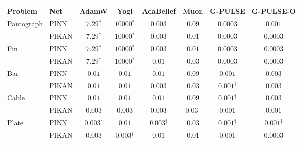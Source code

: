 \begin{tabular}{llcccccc}
\toprule
Problem & Net & AdamW & Yogi & AdaBelief & Muon & G-PULSE & G-PULSE-O\\
\midrule
Pantograph & PINN & $7.29$$^{*}$ & $10000$$^{*}$ & $0.003$ & $0.09$ & $0.0003$ & $0.001$\\
 & PIKAN & $7.29$$^{*}$ & $10000$$^{*}$ & $0.003$ & $0.01$ & $0.0003$ & $0.0003$\\
Fin & PINN & $7.29$$^{*}$ & $10000$$^{*}$ & $0.003$ & $0.01$ & $0.0003$ & $0.0003$\\
 & PIKAN & $7.29$$^{*}$ & $10000$$^{*}$ & $0.01$ & $0.03$ & $0.0003$ & $0.0003$\\
Bar & PINN & $0.01$ & $0.01$ & $0.01$ & $0.09$ & $0.001$ & $0.003$\\
 & PIKAN & $0.01$ & $0.01$ & $0.003$ & $0.03$ & $0.001$$^{\dagger}$ & $0.003$\\
Cable & PINN & $0.01$ & $0.01$ & $0.01$ & $0.09$ & $0.001$$^{\dagger}$ & $0.003$\\
 & PIKAN & $0.003$ & $0.003$ & $0.003$ & $0.03$$^{\dagger}$ & $0.001$ & $0.001$\\
Plate & PINN & $0.003$$^{\dagger}$ & $0.01$ & $0.003$$^{\dagger}$ & $0.03$ & $0.001$$^{\dagger}$ & $0.001$$^{\dagger}$\\
 & PIKAN & $0.003$ & $0.003$$^{\dagger}$ & $0.01$ & $0.01$ & $0.001$ & $0.0003$\\
\bottomrule
\end{tabular}